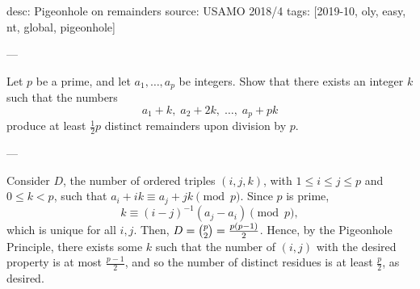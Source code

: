desc: Pigeonhole on remainders
source: USAMO 2018/4
tags: [2019-10, oly, easy, nt, global, pigeonhole]

---

Let $p$ be a prime, and let $a_1,\ldots,a_p$ be integers. Show that there exists an integer $k$ such that the numbers \[a_1+k,\;a_2+2k,\;\ldots,\;a_p+pk\]
produce at least $\frac12p$ distinct remainders upon division by $p$.

---

Consider $D$, the number of ordered triples $(i,j,k)$, with $1\le i\le j\le p$ and $0\le k<p$, such that $a_i+ik\equiv a_j+jk\pmod p$. Since $p$ is prime, \[k\equiv (i-j)^{-1}(a_j-a_i)\pmod p,\]
which is unique for all $i,j$. Then, $D=\tbinom p2=\tfrac{p(p-1)}2$. Hence, by the Pigeonhole Principle, there exists some $k$ such that the number of $(i,j)$ with the desired property is at most $\tfrac{p-1}2$, and so the number of distinct residues is at least $\tfrac p2$, as desired.
